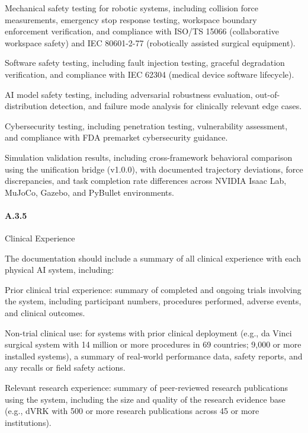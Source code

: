\documentclass[11pt]{article}
\begin{document}
\begin{description}[leftmargin=2.5cm,style=sameline]

\item[(a)] Mechanical safety testing for robotic systems, including collision force measurements, emergency stop response testing, workspace boundary enforcement verification, and compliance with ISO/TS 15066 (collaborative workspace safety) and IEC 80601-2-77 (robotically assisted surgical equipment).

\item[(b)] Software safety testing, including fault injection testing, graceful degradation verification, and compliance with IEC 62304 (medical device software lifecycle).

\item[(c)] AI model safety testing, including adversarial robustness evaluation, out-of-distribution detection, and failure mode analysis for clinically relevant edge cases.

\item[(d)] Cybersecurity testing, including penetration testing, vulnerability assessment, and compliance with FDA premarket cybersecurity guidance.

\item[(e)] Simulation validation results, including cross-framework behavioral comparison using the unification bridge (v1.0.0), with documented trajectory deviations, force discrepancies, and task completion rate differences across NVIDIA Isaac Lab, MuJoCo, Gazebo, and PyBullet environments.

\end{description}

\paragraph{A.3.5} Clinical Experience

The documentation should include a summary of all clinical experience with each physical AI system, including:

\begin{description}[leftmargin=2.5cm,style=sameline]

\item[(a)] Prior clinical trial experience: summary of completed and ongoing trials involving the system, including participant numbers, procedures performed, adverse events, and clinical outcomes.

\item[(b)] Non-trial clinical use: for systems with prior clinical deployment (e.g., da Vinci surgical system with 14 million or more procedures in 69 countries; 9,000 or more installed systems), a summary of real-world performance data, safety reports, and any recalls or field safety actions.

\item[(c)] Relevant research experience: summary of peer-reviewed research publications using the system, including the size and quality of the research evidence base (e.g., dVRK with 500 or more research publications across 45 or more institutions).

\end{description}
\end{document}
